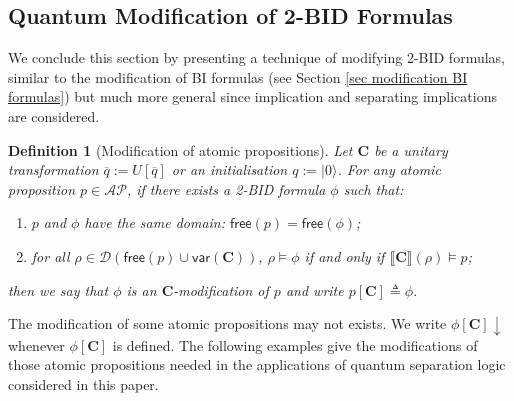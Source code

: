 \documentclass[conference,compsoc, 10pt]{IEEEtran}
\newtheorem{definition}{Definition}[section]
\newcommand {\qI} {{q:=|0\rangle}}
\newcommand {\qU} {{\overline{q}:=U[\overline{q}]}}
\newcommand {\cD } {{\mathcal{D}}}
\newcommand{\Mexist}{{\downarrow}}
\newcommand {\V }[1] {{\mathsf{free}{\left(#1\right)}}}
\newcommand {\var } {\mathsf{var}}
\newcommand {\prog } {{\mathbf{C}}}
\newcommand {\sem}[1] {\llbracket#1\rrbracket}
\newcommand {\AP} {{\mathcal{AP}}}
\begin{document}
\begin{appendices}
		
		
		\subsection{Quantum Modification of 2-BID Formulas}
		
		We conclude this section by presenting a technique of modifying 2-BID formulas, similar to the modification of BI formulas (see Section \ref{sec modification BI formulas}) but much more general since implication and separating implications are considered.
		
		\begin{definition}[Modification of atomic propositions]
			\label{def sub atomic prop 2BID}
			Let $\prog$ be a unitary transformation $\qU$ or an initialisation $\qI$. For any atomic proposition $p\in\AP$, if there exists a 2-BID formula $\phi$ such that:
			\begin{enumerate}
				\item $p$ and $\phi$ have the same domain: $\V{p} = \V{\phi}$;
				\item for all $\rho\in\cD(\V{p}\cup\var(\prog))$, $\rho\models \phi$ if and only if $\sem{\prog}(\rho)\models p$;%
			\end{enumerate}
			then we say that $\phi$ is an $\prog$-modification of $p$ and write  $p[\prog]\triangleq \phi$.
		\end{definition}
		
		The modification of some atomic propositions may not exists.
		We write $\phi[\prog]\Mexist$ whenever $\phi[\prog]$ is defined.
		The following examples give the modifications of those atomic propositions needed in the applications of quantum separation logic considered in this paper.
		

\end{appendices}
\end{document}
